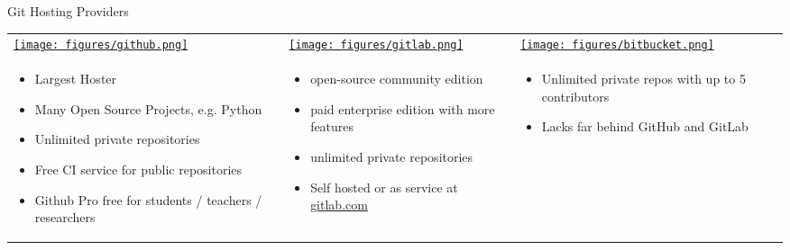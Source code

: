\begin{frame}[c]{Git Hosting Providers}
  \small
  \begin{tabu}{@{} X[,C] @{} X[,C] @{} X[,C] @{}}
    \href{https://github.com}{\texttt{[image: figures/github.png]}} &
    \href{https://gitlab.com}{\texttt{[image: figures/gitlab.png]}} &
    \href{https://bitbucket.org}{\texttt{[image: figures/bitbucket.png]}} \\
    \begin{itemize}
      \item Largest Hoster
      \item Many Open Source Projects, e.g. Python
      \item Unlimited private repositories
      \item Free CI service for public repositories
      \item Github Pro free for students / teachers / researchers
    \end{itemize}
    &
    \begin{itemize}
      \item open-source community edition
      \item paid enterprise edition with more features
      \item unlimited private repositories
      \item Self hosted or as service at \href{https://gitlab.com}{gitlab.com}
    \end{itemize}
    &
    \begin{itemize}
      \item Unlimited private repos with up to 5 contributors
      \item Lacks far behind GitHub and GitLab
    \end{itemize}
  \end{tabu}
\end{frame}

